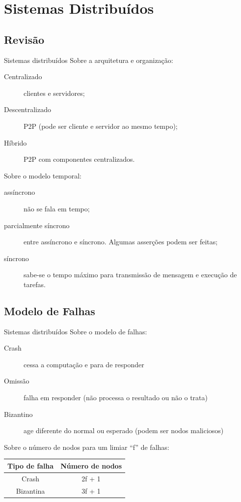 \documentclass[xcolor=dvipsnames,table]{beamer}
\begin{document}

\section{Sistemas Distribuídos}
\subsection{Revisão}
\begin{frame}{Sistemas distribuídos}
	Sobre a arquitetura e organização:
	\begin{description}
		\item[Centralizado] clientes e servidores;
		\item[Descentralizado] P2P (pode ser cliente e servidor ao mesmo tempo);
		\item[Híbrido] P2P com componentes centralizados.
	\end{description}
	
	\pause

	Sobre o modelo temporal:
	\begin{description}
		\item[assíncrono] não se fala em tempo;
		\item[parcialmente síncrono] entre assíncrono e síncrono. Algumas asserções podem ser feitas;
		\item[síncrono] sabe-se o tempo máximo para transmissão de mensagem e execução de tarefas.
	\end{description}
\end{frame}

\subsection{Modelo de Falhas}
\begin{frame}{Sistemas distribuídos}
	Sobre o modelo de falhas:
	\begin{description}
		\item[Crash] cessa a computação e para de responder
		\item[Omissão] falha em responder (não processa o resultado ou não o trata)
		\item[Bizantino] age diferente do normal ou esperado (podem ser nodos maliciosos)
	\end{description}
	
	\pause
	
	Sobre o número de nodos para um limiar ``f'' de falhas:
	\begin{center}
		\begin{tabular}{||c|c||}
			\hline
			\textbf{Tipo de falha} & \textbf{Número de nodos} \\
			\hline
			\hline
			Crash & 2f + 1 \\
			\hline
			Bizantina & 3f + 1 \\
			\hline
		\end{tabular}
	\end{center}
\end{frame}
\end{document}
